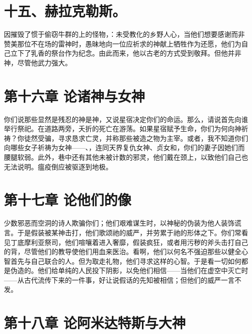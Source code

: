 \section{十五、赫拉克勒斯。}

因摧毁了惯于偷窃牛群的上的怪物，：未受教化的乡野人心，当他们想要感谢而非赞美那位不在场的雷神时，愚昧地向一位应祈求的神献上牺牲作为还愿，他们为自己立下了乳香的祭台作为纪念。由此而来，他以古老的方式受到敬拜。但他并非神，尽管他武力强大。\par


\section{第十六章 论诸神与女神}

你们说那些显然是残忍的神是神，又说星宿决定你们的命运。那么，请说首先向谁举行祭祀。在道路两旁，夭折的死亡在游荡。如果星宿赋予生命，你们为何向神祈祷？你徒然受骗，寻求恳求亡灵，并称那些被造之物为主宰。或者，我不知道你们向哪些女子祈祷为女神——、，连同天界复仇女神、贞女和，你们的妻子因她们而腰腿软弱。此外，巷中还有其他未被计数的邪灵，他们戴在颈上，以致他们自己也无法说明。瘟疫倒应被驱逐到地极。\par


\section{第十七章 论他们的像}

少数邪恶而空洞的诗人欺骗你们；他们艰难谋生时，以神秘的伪装为他人装饰谎言。于是假装被某神击打，他们歌颂祂的威严，并劳累于祂的形体之下。你们常看见丁底摩利亚祭司，他们喧嚷着进入奢靡，假装疯狂，或者用污秽的斧头击打自己的背，尽管他们的教导使他们用血来医治。看啊，他们以何名不强迫那些以健全心智首先与自己联合的人。但为取走礼物，他们寻求这样的心智。于是看一切如何都是伪造的。他们给单纯的人民投下阴影，以免他们相信——当他们在虚空中灭亡时——从古代流传下来的一件事，好让说假话的先知被相信；但他们的威严一言不发。\par


\section{第十八章 论阿米达特斯与大神}

